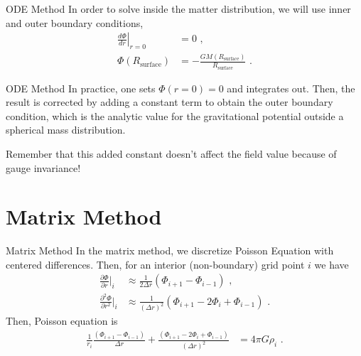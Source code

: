 \documentclass[11pt]{beamer}
\begin{document}
\begin{frame}[fragile]{ODE Method}
In order to solve inside the matter distribution, we will use
inner and outer boundary conditions,
\begin{equation}
\begin{aligned}
\left . \frac{d \Phi}{dr} \right| _{r=0} & = 0\,\,,\\
\Phi(R_\mathrm{surface}) &= - \frac{GM(R_\mathrm{surface})}{R_\mathrm{surface}}\,\,.
\end{aligned}
\end{equation}
\end{frame}

\begin{frame}[fragile]{ODE Method}
In practice, one sets $\Phi(r=0) = 0$ and integrates out. Then, the 
result is corrected by adding a constant term to obtain the outer
boundary condition, which is the analytic value for the
gravitational potential outside a spherical mass distribution.  \\
\bigskip

Remember that this added constant doesn't affect the field value 
because of gauge invariance!
\end{frame}

\section{Matrix Method}
\begin{frame}[fragile]{Matrix Method}
In the matrix method, we discretize Poisson Equation
with centered differences. Then, for an interior (non-boundary) grid point $i$ we have
\begin{equation}
\begin{aligned}
\frac{\partial \Phi }{\partial r} \bigg|_i &\approx \frac{1}{2\Delta r} \left(\Phi_{i+1} - \Phi_{i-1}\right)\,\,,\\
\frac{\partial^2 \Phi }{\partial r^2}  \bigg|_i &\approx \frac{1}{(\Delta r)^2} \left(\Phi_{i+1} - 2 \Phi_i + \Phi_{i-1} \right)\,\,.
\end{aligned}
\end{equation}
Then, Poisson equation is
\begin{equation}
\begin{aligned}
\frac{1}{r_i} \frac{\left(\Phi_{i+1} - \Phi_{i-1}\right)}{\Delta r}  + \frac{\left(\Phi_{i+1} - 2 \Phi_i + \Phi_{i-1} \right)}{(\Delta r)^2}  &= 4\pi G \rho_i\,\,.
\end{aligned}
\end{equation}
\end{frame}
\end{document}
